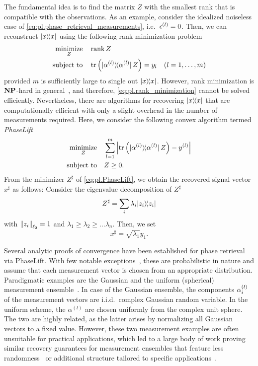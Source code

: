 The fundamental idea is to find the matrix $Z$ with the smallest rank that is compatible with the observations.
As an example, consider the idealized noiseless case of \cref{eq:pl.phase_retrieval_measurements}, i.e.\ $\epsilon^{(l)} = 0$.
Then, we can reconstruct $\ketbra{x}$ using the following rank-minimization problem
\[
  \begin{split}
    \underset{{Z}}{\textrm{minimize}} &\quad \rank Z \\
    \textrm{subject to} &\quad  \tr\left( \ketbra{\alpha\ind{l}} \, Z \right) = y_l \quad (l=1,\ldots,m)
  \end{split}
  \label{eq:pl.rank_minimization}
\]
provided $m$ is sufficiently large to single out $\ketbra{x}$.
However, rank minimization is $\mathbf{NP}$-hard in general~\cite{Boyd_2004_Convex}, and therefore, \cref{eq:pl.rank_minimization} cannot be solved efficiently.
Nevertheless, there are algorithms for recovering $\ketbra{x}$ that are computationally efficient with only a slight overhead in the number of measurements required.
Here, we consider the following convex algorithm termed \emph{PhaseLift}~\cite{Candes_2013_Phaselift}
\[
  \label{eq:pl.PhaseLift}
  \begin{split}
    \underset{{Z}}{\textrm{minimize}} & \quad \sum_{l=1}^m \left| \tr \left( \ket{\alpha^{(l)}} \bra{\alpha^{(l)}} \, {Z} \right) - y^{(l)} \right| \\
    \textrm{subject to} &\quad  {Z} \geq 0. \nonumber
  \end{split}
\]
From the minimizer $Z^\sharp$ of \cref{eq:pl.PhaseLift}, we obtain the recovered signal vector ${ x}^\sharp$ as follows:
Consider the eigenvalue decomposition of $Z^\sharp$
\[
  Z^\sharp = \sum_i \lambda_i \ketbra{z_i}
\]
with ${\Vert z_i\Vert}_{\ell_2} = 1$ and $\lambda_1 \ge \lambda_2 \ge \ldots \lambda_n$.
Then, we set
\[
  x^\sharp = \sqrt{\lambda_1} y_1.
  \label{eq:pl.vector_from_matrix}
\]

Several analytic proofs of convergence have been established for phase retrieval via PhaseLift.
With few notable exceptions~\cite{Kech_2016_Explicit}, these are probabilistic in nature and assume that each measurement vector is chosen from an appropriate distribution.
Paradigmatic examples are the Gaussian and the uniform (spherical) measurement ensemble~\cite{Candes_2013_Phaselift}.
In case of the Gaussian ensemble, the components $\alpha^{(l)}_i$ of the measurement vectors are i.i.d.\ complex Gaussian random variable.
In the uniform scheme, the $\alpha^{(l)}$ are chosen uniformly from the complex unit sphere.
The two are highly related, as the latter arises by normalizing all Gaussian vectors to a fixed value.
However, these two measurement examples are often unsuitable for practical applications, which led to a large body of work proving similar recovery guarantees  for measurement ensembles that feature less randomness~\cite{Gross_2014_Partial,Kueng_2014_Low,Kueng_2014_Low,Kueng_2016_Low} or additional structure tailored to specific applications~\cite{Candes_2013_Phaselift,Gross_2017_Improved,Voroninski_2013_Quantum,Kueng_2015_Low}.

